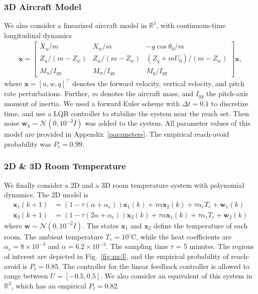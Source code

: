 \documentclass[journal,twoside,web]{ieeecolor}
\newcommand{\reach}{\mathrm{r}}
\newcommand{\pw}{\mathbf{w}}
\newcommand{\px}{\mathbf{x}}
\newcommand{\reals}{\mathbb{R}}
\newcommand{\N}{\mathcal{N}}
\theoremstyle{definition}
\theoremstyle{plain}
\theoremstyle{plain}
\begin{document}
\subsubsection{3D Aircraft Model}
\label{sec:aicraft}
We also consider a linearized aircraft model in $\reals^{3}$, with continuous-time longitudinal dynamics
{\footnotesize
\begin{align*}
    \dot{\px} =
    \begin{bmatrix}
        X_u/m & X_w/m & -g\cos\theta_0/m\\
        Z_u/(m-Z_{\dot w}) & Z_w/(m-Z_{\dot w}) & (Z_q+mU_0)/(m-Z_{\dot w})\\
        M_u/I_{yy} & M_w/I_{yy} & M_q/I_{yy}
    \end{bmatrix} \px,
\end{align*}
}
where $\mathbf{x} = [u, w, q]^\top$ denotes the forward velocity, vertical velocity, and pitch rate perturbations. Further, $m$ denotes the aircraft mass, and $I_{yy}$ the pitch-axis moment of inertia. We used a forward Euler scheme with $\Delta t = 0.1$ to discretize time, and use a LQR controller to stabilize the system near the reach set. Then noise $\pw_k \sim \N(0, 10^{-2}I)$ was added to the system. 
All parameter values of this model are provided in Appendix~\ref{parameters}.
% 
The empirical reach-avoid probability was $P_\reach = 0.99$. 



\subsubsection{2D \& 3D Room Temperature}
We finally consider a 2D and a 3D room temperature system with polynomial dynamics.  The 2D model is
{\small
\begin{align*}
    \textbf{x}_1(k+1) & = (1 - \tau(\alpha + \alpha_e)) \px_1(k) + \tau \alpha \px_2(k) + \tau \alpha_e T_e + \pw_1(k) \\
    \textbf{x}_2(k+1) & = (1 - \tau(2\alpha + \alpha_e)) \px_2(k) + \tau \alpha \px_1(k) + \tau \alpha_e T_e + \pw_2(k)
\end{align*}
}
where $\pw \sim \N(0, 10^{-2}I)$. The states $\px_1$ and $\px_2$ define the temperature of each room. The ambient temperature $T_e = 10^\circ$C, while the heat coefficients are $\alpha_e = 8 \times 10^{-3}$ and $\alpha = 6.2 \times 10^{-3}$. The sampling time $\tau$ = 5 minutes. The regions of interest are depicted in Fig.~\ref{fig:mc3}, and the empirical probability of reach-avoid is $P_\reach = 0.85$. The controller for the linear feedback controller is allowed to range between $U = [-0.5, 0.5]$. 
We also consider an equivalent of this system in $\reals^{3}$, which has an empirical $P_\reach = 0.82$.
\end{document}
